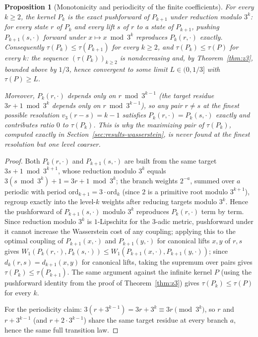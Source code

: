 \documentclass[11pt]{amsart}
\newtheorem{proposition}[theorem]{Proposition}
\theoremstyle{definition}
\theoremstyle{remark}
\newcommand{\dW}{W_1}
\begin{document}
\begin{proposition}[Monotonicity and periodicity of the finite coefficients]\label{prop:taumonotone}
For every $k \ge 2$, the kernel $P_k$ is the exact pushforward of $P_{k+1}$ under reduction modulo $3^k$: for every state $r$ of $P_k$ and every lift $s$ of $r$ to a state of $P_{k+1}$, pushing $P_{k+1}(s,\cdot)$ forward under $x \mapsto x \bmod 3^k$ reproduces $P_k(r,\cdot)$ exactly. Consequently $\tau(P_k) \le \tau(P_{k+1})$ for every $k \ge 2$, and $\tau(P_k) \le \tau(P)$ for every $k$: the sequence $(\tau(P_k))_{k \ge 2}$ is nondecreasing and, by Theorem~\ref{thm:z3}, bounded above by $1/3$, hence convergent to some limit $L \in (0,1/3]$ with $\tau(P) \ge L$.

Moreover, $P_k(r,\cdot)$ depends only on $r \bmod 3^{k-1}$ (the target residue $3r+1 \bmod 3^k$ depends only on $r \bmod 3^{k-1}$), so any pair $r \ne s$ at the finest possible resolution $v_3(r-s) = k-1$ satisfies $P_k(r,\cdot) = P_k(s,\cdot)$ exactly and contributes ratio $0$ to $\tau(P_k)$. This is why the maximizing pair of $\tau(P_k)$, computed exactly in Section~\ref{sec:results-wasserstein}, is never found at the finest resolution but one level coarser.
\end{proposition}

\begin{proof}
Both $P_k(r,\cdot)$ and $P_{k+1}(s,\cdot)$ are built from the same target $3s+1 \bmod 3^{k+1}$, whose reduction modulo $3^k$ equals $3(s \bmod 3^k) + 1 = 3r+1 \bmod 3^k$; the branch weights $2^{-a}$, summed over $a$ periodic with period $\mathrm{ord}_{k+1} = 3 \cdot \mathrm{ord}_k$ (since $2$ is a primitive root modulo $3^{k+1}$), regroup exactly into the level-$k$ weights after reducing targets modulo $3^k$. Hence the pushforward of $P_{k+1}(s,\cdot)$ modulo $3^k$ reproduces $P_k(r,\cdot)$ term by term. Since reduction modulo $3^k$ is $1$-Lipschitz for the $3$-adic metric, pushforward under it cannot increase the Wasserstein cost of any coupling; applying this to the optimal coupling of $P_{k+1}(x,\cdot)$ and $P_{k+1}(y,\cdot)$ for canonical lifts $x,y$ of $r,s$ gives $\dW(P_k(r,\cdot),P_k(s,\cdot)) \le \dW(P_{k+1}(x,\cdot),P_{k+1}(y,\cdot))$; since $d_k(r,s) = d_{k+1}(x,y)$ for canonical lifts, taking the supremum over pairs gives $\tau(P_k) \le \tau(P_{k+1})$. The same argument against the infinite kernel $P$ (using the pushforward identity from the proof of Theorem~\ref{thm:z3}) gives $\tau(P_k) \le \tau(P)$ for every $k$.

For the periodicity claim: $3(r + 3^{k-1}) = 3r + 3^k \equiv 3r \pmod{3^k}$, so $r$ and $r + 3^{k-1}$ (and $r + 2\cdot 3^{k-1}$) share the same target residue at every branch $a$, hence the same full transition law.
\end{proof}
\end{document}
